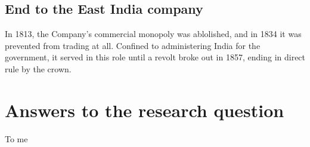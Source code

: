 \documentclass[11pt, a4paper, headings=standardclasses]{scrartcl}
\begin{document}
\subsection{End to the East India company}

In 1813, the Company's commercial monopoly was ablolished, and in 1834 it was prevented from trading at all. Confined to administering India for the government, it served in this role until a revolt broke out in 1857, ending in direct rule by the crown.\autocite{parliament}

\section{Answers to the research question}

To me
\clearpage
\appendix
{}
\printbibliography
\end{document}
